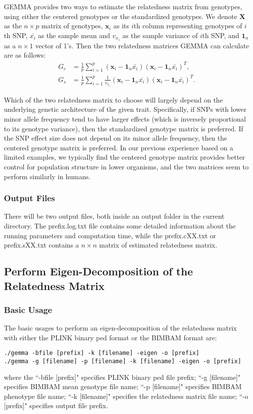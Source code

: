 \documentclass[11pt]{article}
\begin{document}
GEMMA provides two ways to estimate the relatedness matrix from genotypes, using either the centered genotypes or the standardized genotypes. We denote $\mathbf X$ as the $n\times p$ matrix of genotypes, $\mathbf x_i$ as its $i$th column representing genotypes of $i$th SNP, $\bar{x_i}$ as the sample mean and $v_{x_i}$ as the sample variance of $i$th SNP, and $\mathbf 1_n$ as a $n\times 1$ vector of 1's. Then the two relatedness matrices GEMMA can calculate are as follows:
%
\begin{align*}
G_c&=\frac{1}{p}\sum_{i=1}^p (\mathbf x_i-\mathbf 1_n \bar{x_i})(\mathbf x_i-\mathbf 1_n \bar{x_i})^T, \\
G_s&=\frac{1}{p}\sum_{i=1}^p \frac{1}{v_{x_i}}(\mathbf x_i-\mathbf 1_n \bar{x_i})(\mathbf x_i-\mathbf 1_n \bar{x_i})^T.
\end{align*}
%

Which of the two relatedness matrix to choose will largely depend on the underlying genetic architecture of the given trait. Specifically, if SNPs with lower minor allele frequency tend to have larger effects (which is inversely proportional to its genotype variance), then the standardized genotype matrix is preferred. If the SNP effect size does not depend on its minor allele frequency, then the centered genotype matrix is preferred. In our previous experience based on a limited examples, we typically find the centered genotype matrix provides better control for population structure in lower organisms, and the two matrices seem to perform similarly in humans. 




\subsubsection{Output Files}
There will be two output files, both inside an output folder in the current directory. The prefix.log.txt file contains some detailed information about the running parameters and computation time, while the prefix.cXX.txt or prefix.sXX.txt contains a $n\times n$ matrix of estimated relatedness matrix.



\subsection{Perform Eigen-Decomposition of the Relatedness Matrix}
\subsubsection{Basic Usage}
The basic usages to perform an eigen-decomposition of the relatedness matrix with either the PLINK binary ped format or the BIMBAM format are:
%
\begin{verbatim}
./gemma -bfile [prefix] -k [filename] -eigen -o [prefix]
./gemma -g [filename] -p [filename] -k [filename] -eigen -o [prefix]
\end{verbatim}
%
where the ``-bfile [prefix]" specifies PLINK binary ped file prefix; ``-g [filename]" specifies BIMBAM mean genotype file name; ``-p [filename]" specifies BIMBAM phenotype file name; ``-k [filename]" specifies the relatedness matrix file name; ``-o [prefix]" specifies output file prefix. 
\end{document}
